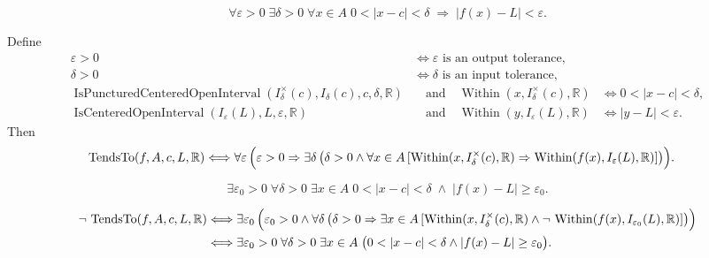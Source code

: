 \begin{remark*}
\[
  \forall\varepsilon > 0\;\exists\delta > 0\;\forall x \in A\;
  0 < |x - c| < \delta
  \;\Rightarrow\;
  |f(x) - L| < \varepsilon.
\]
\end{remark*}

\begin{remark*}
Define
\[
\begin{aligned}
  \varepsilon>0
  &\Longleftrightarrow \varepsilon\text{ is an output tolerance},\\
  \delta>0
  &\Longleftrightarrow \delta\text{ is an input tolerance},\\
  \operatorname{IsPuncturedCenteredOpenInterval}
  (I^\times_\delta(c),I_\delta(c),c,\delta,\mathbb R)
  &\quad\text{and}\quad
  \operatorname{Within}(x,I^\times_\delta(c),\mathbb R)
  &\Longleftrightarrow 0<|x-c|<\delta,\\
  \operatorname{IsCenteredOpenInterval}
  (I_\varepsilon(L),L,\varepsilon,\mathbb R)
  &\quad\text{and}\quad
  \operatorname{Within}(y,I_\varepsilon(L),\mathbb R)
  &\Longleftrightarrow |y-L|<\varepsilon.
\end{aligned}
\]
Then
\[
\begin{aligned}
  \operatorname{TendsTo}(f,A,c,L,\mathbb{R})
  &\Longleftrightarrow
  \forall \varepsilon\,
  \Bigl(
    \varepsilon>0
    \Rightarrow
    \exists \delta\,
    \bigl(
      \delta>0
      \wedge
      \forall x\in A\,
      [
        \operatorname{Within}(x,I^\times_\delta(c),\mathbb R)
        \Rightarrow
        \operatorname{Within}(f(x),I_\varepsilon(L),\mathbb R)
      ]
    \bigr)
  \Bigr).
\end{aligned}
\]
\end{remark*}

\begin{remark*}
\[
  \exists\varepsilon_0 > 0\;\forall\delta > 0\;\exists x \in A\;
  0<|x-c|<\delta\;\wedge\; |f(x)-L|\geq\varepsilon_0.
\]
\end{remark*}

\begin{remark*}
\[
\begin{aligned}
  \neg\,\operatorname{TendsTo}(f,A,c,L,\mathbb{R})
  &\Longleftrightarrow
  \exists \varepsilon_0\,
  \Bigl(
    \varepsilon_0>0
    \wedge
    \forall \delta\,
    \bigl(
      \delta>0
      \Rightarrow
      \exists x\in A\,
      [
        \operatorname{Within}(x,I^\times_\delta(c),\mathbb R)
        \wedge
        \neg\,\operatorname{Within}(f(x),I_{\varepsilon_0}(L),\mathbb R)
      ]
    \bigr)
  \Bigr)\\
  &\Longleftrightarrow
  \exists \varepsilon_0>0\;
  \forall \delta>0\;
  \exists x\in A\;
  \bigl(
    0<|x-c|<\delta
    \wedge
    |f(x)-L|\geq\varepsilon_0
  \bigr).
\end{aligned}
\]
\end{remark*}

